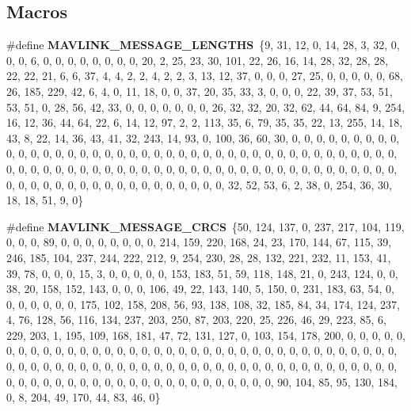 \subsection*{Macros}
\begin{DoxyCompactItemize}
\item 
\#define \textbf{ M\+A\+V\+L\+I\+N\+K\+\_\+\+M\+E\+S\+S\+A\+G\+E\+\_\+\+L\+E\+N\+G\+T\+HS}~\{9, 31, 12, 0, 14, 28, 3, 32, 0, 0, 0, 6, 0, 0, 0, 0, 0, 0, 0, 0, 20, 2, 25, 23, 30, 101, 22, 26, 16, 14, 28, 32, 28, 28, 22, 22, 21, 6, 6, 37, 4, 4, 2, 2, 4, 2, 2, 3, 13, 12, 37, 0, 0, 0, 27, 25, 0, 0, 0, 0, 0, 68, 26, 185, 229, 42, 6, 4, 0, 11, 18, 0, 0, 37, 20, 35, 33, 3, 0, 0, 0, 22, 39, 37, 53, 51, 53, 51, 0, 28, 56, 42, 33, 0, 0, 0, 0, 0, 0, 0, 26, 32, 32, 20, 32, 62, 44, 64, 84, 9, 254, 16, 12, 36, 44, 64, 22, 6, 14, 12, 97, 2, 2, 113, 35, 6, 79, 35, 35, 22, 13, 255, 14, 18, 43, 8, 22, 14, 36, 43, 41, 32, 243, 14, 93, 0, 100, 36, 60, 30, 0, 0, 0, 0, 0, 0, 0, 0, 0, 0, 0, 0, 0, 0, 0, 0, 0, 0, 0, 0, 0, 0, 0, 0, 0, 0, 0, 0, 0, 0, 0, 0, 0, 0, 0, 0, 0, 0, 0, 0, 0, 0, 0, 0, 0, 0, 0, 0, 0, 0, 0, 0, 0, 0, 0, 0, 0, 0, 0, 0, 0, 0, 0, 0, 0, 0, 0, 0, 0, 0, 0, 0, 0, 0, 0, 0, 0, 0, 0, 0, 0, 0, 0, 0, 0, 0, 0, 0, 0, 0, 0, 32, 52, 53, 6, 2, 38, 0, 254, 36, 30, 18, 18, 51, 9, 0\}
\item 
\#define \textbf{ M\+A\+V\+L\+I\+N\+K\+\_\+\+M\+E\+S\+S\+A\+G\+E\+\_\+\+C\+R\+CS}~\{50, 124, 137, 0, 237, 217, 104, 119, 0, 0, 0, 89, 0, 0, 0, 0, 0, 0, 0, 0, 214, 159, 220, 168, 24, 23, 170, 144, 67, 115, 39, 246, 185, 104, 237, 244, 222, 212, 9, 254, 230, 28, 28, 132, 221, 232, 11, 153, 41, 39, 78, 0, 0, 0, 15, 3, 0, 0, 0, 0, 0, 153, 183, 51, 59, 118, 148, 21, 0, 243, 124, 0, 0, 38, 20, 158, 152, 143, 0, 0, 0, 106, 49, 22, 143, 140, 5, 150, 0, 231, 183, 63, 54, 0, 0, 0, 0, 0, 0, 0, 175, 102, 158, 208, 56, 93, 138, 108, 32, 185, 84, 34, 174, 124, 237, 4, 76, 128, 56, 116, 134, 237, 203, 250, 87, 203, 220, 25, 226, 46, 29, 223, 85, 6, 229, 203, 1, 195, 109, 168, 181, 47, 72, 131, 127, 0, 103, 154, 178, 200, 0, 0, 0, 0, 0, 0, 0, 0, 0, 0, 0, 0, 0, 0, 0, 0, 0, 0, 0, 0, 0, 0, 0, 0, 0, 0, 0, 0, 0, 0, 0, 0, 0, 0, 0, 0, 0, 0, 0, 0, 0, 0, 0, 0, 0, 0, 0, 0, 0, 0, 0, 0, 0, 0, 0, 0, 0, 0, 0, 0, 0, 0, 0, 0, 0, 0, 0, 0, 0, 0, 0, 0, 0, 0, 0, 0, 0, 0, 0, 0, 0, 0, 0, 0, 0, 0, 0, 0, 0, 0, 0, 90, 104, 85, 95, 130, 184, 0, 8, 204, 49, 170, 44, 83, 46, 0\}
\item 

\end{DoxyCompactItemize}
